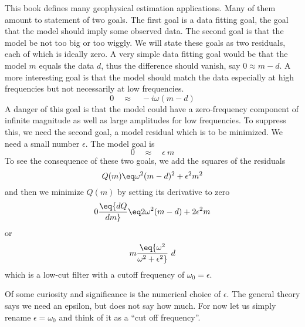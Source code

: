 This book defines many geophysical estimation applications.
Many of them amount to statement of two goals.
The first goal is a data fitting goal,
the goal that the model should imply some observed data.
The second goal is that the model be not too big or too wiggly.
We will state these goals as two residuals, each of which is ideally zero.
A very simple data fitting goal would be that
the model $m$ equals the data $d$,
thus the difference should vanish, say $0\approx  m- d$.
A more interesting goal is that the model should match the data
especially at high frequencies but not necessarily at low frequencies.
\begin{equation}
0 \quad\approx\quad  -i\omega(m - d)
\end{equation}
A danger of this goal is that the model could have a zero-frequency component
of infinite magnitude as well as large amplitudes for low frequencies.
To suppress this, we need the second goal, a model residual
which is to be minimized.  We need a small number $\epsilon$.
The model goal is
\begin{equation}
0 \quad\approx\quad \epsilon \ m
\end{equation}
To see the consequence of these two goals,
we add the squares of the residuals
\begin{equation}
 Q(m) \eq \omega^2 (m-d)^2 + \epsilon^2  m^2
\end{equation}
and then we minimize $Q(m)$ by setting its derivative to zero
\begin{equation}
0\eq {dQ\over dm} \eq 2 \omega^2 (m-d) + 2\epsilon^2  m
\end{equation}
or
\begin{equation}
m \eq  {\omega^2 \over \omega^2+ \epsilon^2}\  d
\label{eqn:lowcut}
\end{equation}
which is a low-cut filter
with a cutoff frequency of $\omega_0=\epsilon$.

\par
Of some curiosity and significance is the numerical choice of $\epsilon$.
The general theory says we need an epsilon,
but does not say how much.
For now let us simply rename $\epsilon=\omega_0$
and think of it as a ``cut off frequency''.


